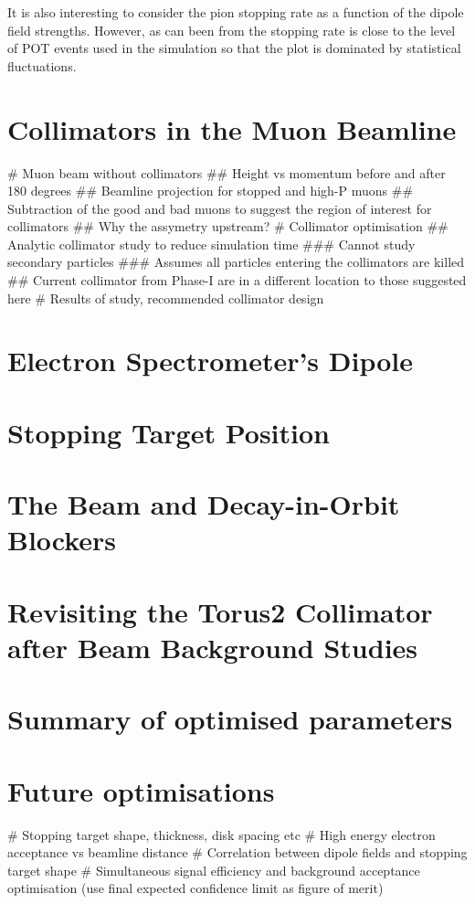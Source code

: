 It is also interesting to consider the pion stopping rate as a function of the dipole field strengths.
However, as can been from  the stopping rate is close to the level of POT events used in the simulation so that the plot is dominated by statistical fluctuations.

\section{Collimators in the Muon Beamline}
\begin{easylist}
# Muon beam without collimators
	## Height vs momentum before and after 180 degrees
	## Beamline projection for stopped and high-P muons
	## Subtraction of the good and bad muons to suggest the region of interest for collimators
	## Why the assymetry upstream?
# Collimator optimisation
	## Analytic collimator study to reduce simulation time
	### Cannot study secondary particles
	### Assumes all particles entering the collimators are killed
	## Current collimator from Phase-I are in a different location to those suggested here
# Results of study, recommended collimator design
\end{easylist}

\section{Electron Spectrometer's Dipole}

\section{Stopping Target Position}
\section{The Beam and Decay-in-Orbit Blockers}

\section{Revisiting the Torus2 Collimator after Beam Background Studies}
\section{Summary of optimised parameters}
\section{Future optimisations}
\begin{easylist}
# Stopping target shape, thickness, disk spacing etc
# High energy electron acceptance vs beamline distance
# Correlation between dipole fields and stopping target shape
# Simultaneous signal efficiency and background acceptance optimisation (use final expected confidence limit as figure of merit)
\end{easylist}
